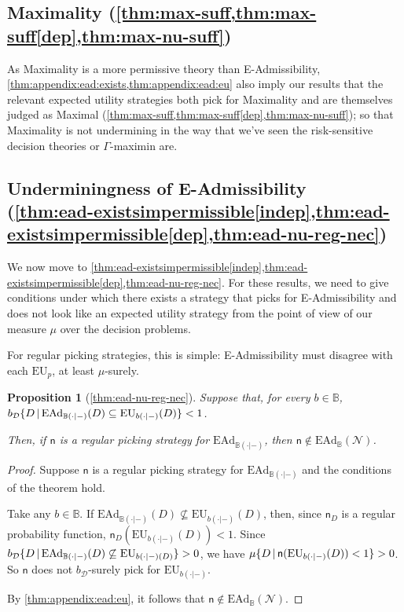 \documentclass[a4paper,final]{article}
\newtheorem{proposition}[theorem]{Proposition}
\newcommand\EU{\mathrm{EU}}
\newcommand\EAd{\mathrm{EAd}}
\newcommand{\D}{\mathcal{D}}
\newcommand{\Decs}{\mathcal{D}}
\newcommand{\n}{\mathsf{n}}
\renewcommand{\nu}{\n}
\newcommand\Nu{\mathcal{N}}
\newcommand{\IB}{\mathbb{B}}
\newcommand\SetDelimiter[1][]{
	\nonscript\,#1\vert \allowbreak \nonscript\,\mathopen{}}
\providecommand\given{\SetDelimiter}
\newenvironment{CCM rewritten}
{\begingroup\color{blue}} %
{\endgroup}              %
\begin{document}
\subsection{Maximality (\cref{thm:max-suff,thm:max-suff[dep],thm:max-nu-suff})}\label{sect:maximality-appendix}
As Maximality is a more permissive theory than E-Admissibility, \cref{thm:appendix:ead:exists,thm:appendix:ead:eu} also imply our results that the relevant expected utility strategies both pick for Maximality and are themselves judged as Maximal (\cref{thm:max-suff,thm:max-suff[dep],thm:max-nu-suff}); so that Maximality is not undermining in the way that we've seen the risk-sensitive decision theories or $\Gamma$-maximin are.

\subsection{Underminingness of E-Admissibility \\(\cref{thm:ead-existsimpermissible[indep],thm:ead-existsimpermissible[dep],thm:ead-nu-reg-nec})}\label{sect:appendix:eadundermining}

We now move to \cref{thm:ead-existsimpermissible[indep],thm:ead-existsimpermissible[dep],thm:ead-nu-reg-nec}. For these results, we need to give conditions under which there exists a strategy that picks for E-Admissibility and does not look like an expected utility strategy from the point of view of our measure $\mu$ over the decision problems. 

For regular picking strategies, this is simple: E-Admissibility must disagree with each $\EU_p$, at least $\mu$-surely.

	\begin{proposition}[\cref{thm:ead-nu-reg-nec}]
	Suppose that, for every $b\in\IB$, $b_\D\{D\given \EAd_{\IB(\cdot|-)}(D)\subseteq\EU_{b(\cdot|-)}(D)\}<1$. 
	
	Then, if $\n$ is a regular picking strategy for $\EAd_{\IB(\cdot|-)}$, then $\n\notin \EAd_\IB(\Nu)$.
\end{proposition}

\begin{proof}
	Suppose $\nu$ is a regular picking strategy for $\EAd_{\IB(\cdot|-)}$ and the conditions of the theorem hold. 
	
	Take any $b\in\IB$.
	If $\EAd_{\IB(\cdot|-)}(D)\not\subseteq\EU_{b(\cdot|-)}(D)$, then, since $\n_D$ is a regular probability function, $\nu_D(\EU_{b(\cdot|-)}(D))< 1$. 
	Since 
	$b_\D\{D\given \EAd_{\IB(\cdot|-)}(D)\not\subseteq\EU_{b(\cdot|-)(D)}\}>0$, we have $\mu\{D\given \nu(\EU_{b(\cdot|-)}(D))<1\}>0$.
	 So $\nu$ does not $b_\Decs$-surely pick for $\EU_{b(\cdot|-)}$. 
	 
	 By \cref{thm:appendix:ead:eu}, it follows that $\nu\notin\EAd_\IB(\Nu)$. 
\end{proof}
\end{document}
